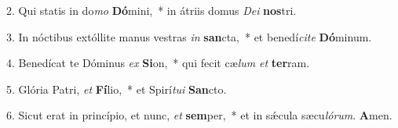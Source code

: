 \item 2. Qui statis in do\textit{mo} \textbf{Dó}mini,~* in átriis domus \textit{Dei} \textbf{nos}tri.
\item 3. In nóctibus extóllite manus vestras \textit{in} \textbf{san}cta,~* et benedí\textit{cite} \textbf{Dó}minum.
\item 4. Benedícat te Dóminus \textit{ex} \textbf{Si}on,~* qui fecit cæ\textit{lum} \textit{et} \textbf{ter}ram.
\item 5. Glória Patri, \textit{et} \textbf{Fí}lio,~* et Spirí\textit{tui} \textbf{San}cto.
\item 6. Sicut erat in princípio, et nunc, \textit{et} \textbf{sem}per,~* et in sǽcula sæcu\hspace{0.03em}\textit{lórum}. \textbf{A}men.
